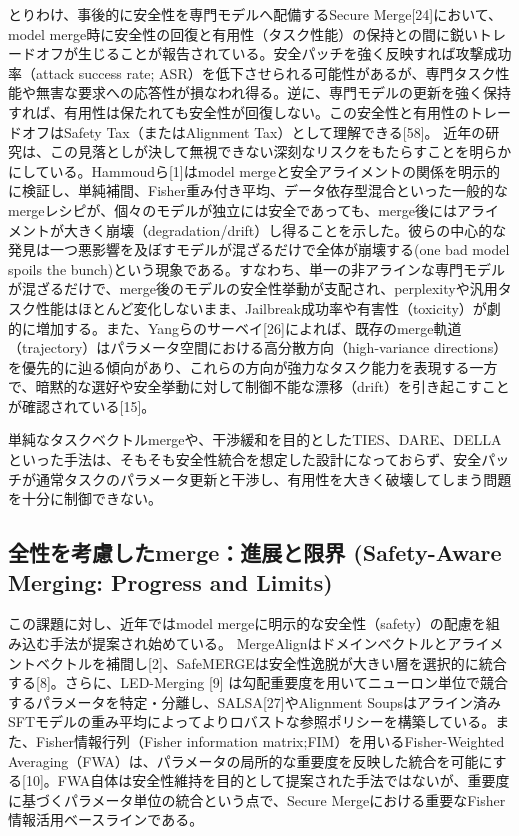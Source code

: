 \documentclass{article}
\begin{document}
とりわけ、事後的に安全性を専門モデルへ配備するSecure Merge[24]において、model merge時に安全性の回復と有用性（タスク性能）の保持との間に鋭いトレードオフが生じることが報告されている。安全パッチを強く反映すれば攻撃成功率（attack success rate; ASR）を低下させられる可能性があるが、専門タスク性能や無害な要求への応答性が損なわれ得る。逆に、専門モデルの更新を強く保持すれば、有用性は保たれても安全性が回復しない。この安全性と有用性のトレードオフはSafety Tax（またはAlignment Tax）として理解できる[58]。
近年の研究は、この見落としが決して無視できない深刻なリスクをもたらすことを明らかにしている。Hammoudら[1]はmodel mergeと安全アライメントの関係を明示的に検証し、単純補間、Fisher重み付き平均、データ依存型混合といった一般的なmergeレシピが、個々のモデルが独立には安全であっても、merge後にはアライメントが大きく崩壊（degradation/drift）し得ることを示した。彼らの中心的な発見は一つ悪影響を及ぼすモデルが混ざるだけで全体が崩壊する(one bad model spoils the bunch)という現象である。すなわち、単一の非アラインな専門モデルが混ざるだけで、merge後のモデルの安全性挙動が支配され、perplexityや汎用タスク性能はほとんど変化しないまま、Jailbreak成功率や有害性（toxicity）が劇的に増加する。また、Yangらのサーベイ[26]によれば、既存のmerge軌道（trajectory）はパラメータ空間における高分散方向（high-variance directions）を優先的に辿る傾向があり、これらの方向が強力なタスク能力を表現する一方で、暗黙的な選好や安全挙動に対して制御不能な漂移（drift）を引き起こすことが確認されている[15]。

単純なタスクベクトルmergeや、干渉緩和を目的としたTIES、DARE、DELLAといった手法は、そもそも安全性統合を想定した設計になっておらず、安全パッチが通常タスクのパラメータ更新と干渉し、有用性を大きく破壊してしまう問題を十分に制御できない。


\subsection{全性を考慮したmerge：進展と限界 (Safety-Aware Merging: Progress and Limits)}
この課題に対し、近年ではmodel mergeに明示的な安全性（safety）の配慮を組み込む手法が提案され始めている。
MergeAlignはドメインベクトルとアライメントベクトルを補間し[2]、SafeMERGEは安全性逸脱が大きい層を選択的に統合する[8]。さらに、LED-Merging [9] は勾配重要度を用いてニューロン単位で競合するパラメータを特定・分離し、SALSA[27]やAlignment Soupsはアライン済みSFTモデルの重み平均によってよりロバストな参照ポリシーを構築している。また、Fisher情報行列（Fisher information matrix;FIM）を用いるFisher-Weighted Averaging（FWA）は、パラメータの局所的な重要度を反映した統合を可能にする[10]。FWA自体は安全性維持を目的として提案された手法ではないが、重要度に基づくパラメータ単位の統合という点で、Secure Mergeにおける重要なFisher情報活用ベースラインである。
\end{document}
